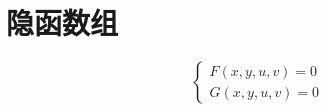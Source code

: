 
\section{隐函数组}

\begin{equation}
    \begin{cases}
        F(x,y,u,v)=0 \\
        G(x,y,u,v)=0
    \end{cases}
\end{equation}

